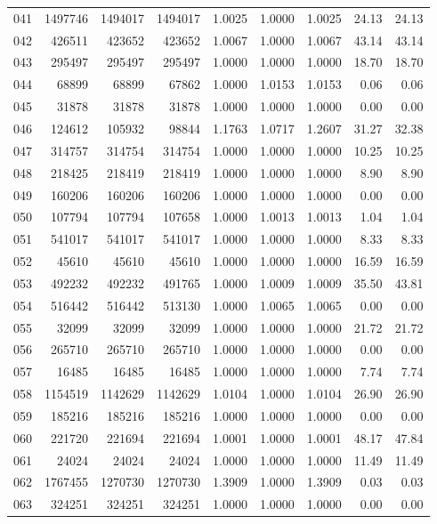 \begin{longtable}{crrrrrrrr}
041 & 1497746 & 1494017 & 1494017 & 1.0025 & 1.0000 & 1.0025 & 24.13 & 24.13 \\
042 & 426511 & 423652 & 423652 & 1.0067 & 1.0000 & 1.0067 & 43.14 & 43.14 \\
043 & 295497 & 295497 & 295497 & 1.0000 & 1.0000 & 1.0000 & 18.70 & 18.70 \\
044 & 68899 & 68899 & 67862 & 1.0000 & 1.0153 & 1.0153 & 0.06 & 0.06 \\
045 & 31878 & 31878 & 31878 & 1.0000 & 1.0000 & 1.0000 & 0.00 & 0.00 \\
046 & 124612 & 105932 & 98844 & 1.1763 & 1.0717 & 1.2607 & 31.27 & 32.38 \\
047 & 314757 & 314754 & 314754 & 1.0000 & 1.0000 & 1.0000 & 10.25 & 10.25 \\
048 & 218425 & 218419 & 218419 & 1.0000 & 1.0000 & 1.0000 & 8.90 & 8.90 \\
049 & 160206 & 160206 & 160206 & 1.0000 & 1.0000 & 1.0000 & 0.00 & 0.00 \\
050 & 107794 & 107794 & 107658 & 1.0000 & 1.0013 & 1.0013 & 1.04 & 1.04 \\
051 & 541017 & 541017 & 541017 & 1.0000 & 1.0000 & 1.0000 & 8.33 & 8.33 \\
052 & 45610 & 45610 & 45610 & 1.0000 & 1.0000 & 1.0000 & 16.59 & 16.59 \\
053 & 492232 & 492232 & 491765 & 1.0000 & 1.0009 & 1.0009 & 35.50 & 43.81 \\
054 & 516442 & 516442 & 513130 & 1.0000 & 1.0065 & 1.0065 & 0.00 & 0.00 \\
055 & 32099 & 32099 & 32099 & 1.0000 & 1.0000 & 1.0000 & 21.72 & 21.72 \\
056 & 265710 & 265710 & 265710 & 1.0000 & 1.0000 & 1.0000 & 0.00 & 0.00 \\
057 & 16485 & 16485 & 16485 & 1.0000 & 1.0000 & 1.0000 & 7.74 & 7.74 \\
058 & 1154519 & 1142629 & 1142629 & 1.0104 & 1.0000 & 1.0104 & 26.90 & 26.90 \\
059 & 185216 & 185216 & 185216 & 1.0000 & 1.0000 & 1.0000 & 0.00 & 0.00 \\
060 & 221720 & 221694 & 221694 & 1.0001 & 1.0000 & 1.0001 & 48.17 & 47.84 \\
061 & 24024 & 24024 & 24024 & 1.0000 & 1.0000 & 1.0000 & 11.49 & 11.49 \\
062 & 1767455 & 1270730 & 1270730 & 1.3909 & 1.0000 & 1.3909 & 0.03 & 0.03 \\
063 & 324251 & 324251 & 324251 & 1.0000 & 1.0000 & 1.0000 & 0.00 & 0.00 \\

\end{longtable}
